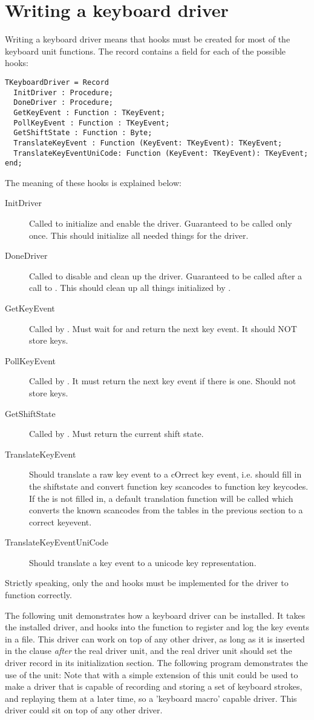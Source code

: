 \section{Writing a keyboard driver}
\label{se:kbddriver}
Writing a keyboard driver means that hooks must be created for most of the 
keyboard unit functions. The  record contains a field
for each of the possible hooks:
\begin{verbatim}
TKeyboardDriver = Record
  InitDriver : Procedure;
  DoneDriver : Procedure;
  GetKeyEvent : Function : TKeyEvent;
  PollKeyEvent : Function : TKeyEvent;
  GetShiftState : Function : Byte;
  TranslateKeyEvent : Function (KeyEvent: TKeyEvent): TKeyEvent;
  TranslateKeyEventUniCode: Function (KeyEvent: TKeyEvent): TKeyEvent;
end;
\end{verbatim}
The meaning of these hooks is explained below:
\begin{description}
\item[InitDriver] Called to initialize and enable the driver. 
Guaranteed to be called only once. This should initialize all needed things
for the driver.
\item[DoneDriver] Called to disable and clean up the driver. Guaranteed to be
called after a call to . This should clean up all
things initialized by .
\item[GetKeyEvent] Called by . Must wait for and return the
next key event. It should NOT store keys.
\item[PollKeyEvent] Called by . It must return the next key
event if there is one. Should not store keys. 
\item[GetShiftState] Called by .  Must return the current
shift state.
\item[TranslateKeyEvent] Should translate a raw key event to a cOrrect
key event, i.e. should fill in the shiftstate and convert function key
scancodes to function key keycodes. If the
 is not filled in, a default translation function
will be called which converts the known scancodes from the tables in the
previous section to a correct keyevent.
\item[TranslateKeyEventUniCode] Should translate a key event to a unicode key
representation. 
\end{description}
Strictly speaking, only the  and 
hooks must be implemented for the driver to function correctly. 

The following unit demonstrates how a keyboard driver can be installed.
It takes the installed driver, and hooks into the 
function to register and log the key events in a file. This driver
can work on top of any other driver, as long as it is inserted in the 
 clause {\em after} the real driver unit, and the real driver unit
should set the driver record in its initialization section.
The following program demonstrates the use of the unit:
Note that with a simple extension of this unit could be used to make a
driver that is capable of recording and storing a set of keyboard strokes,
and replaying them at a later time, so a 'keyboard macro' capable driver.
This driver could sit on top of any other driver.
